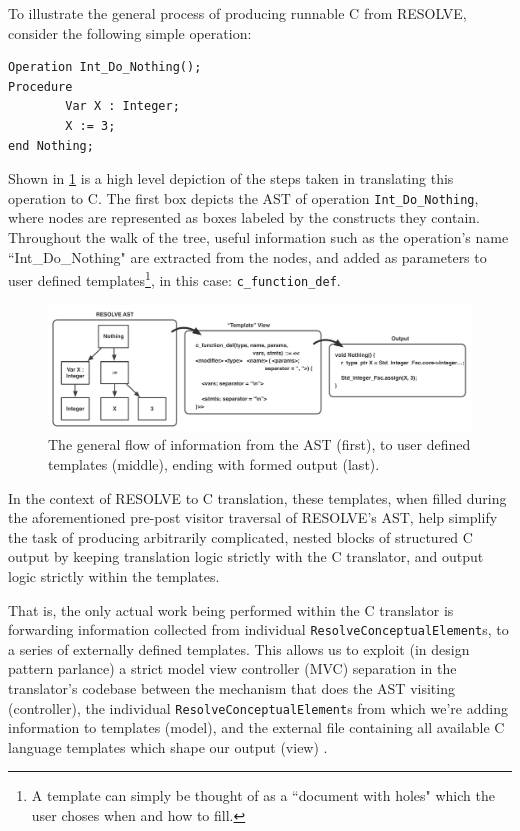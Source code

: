\documentclass[times]{speauth}
\begin{document}
To illustrate the general process of producing runnable C from RESOLVE, consider the following simple operation:

\begin{verbatim}
Operation Int_Do_Nothing();
Procedure
        Var X : Integer;
        X := 3;
end Nothing;
\end{verbatim}

Shown in \ref{fig:translationflow} is a high level depiction of the steps taken in translating this operation to C. The first box depicts the AST of operation \texttt{Int\_Do\_Nothing}, where nodes are represented as boxes labeled by the constructs they contain. Throughout the walk of the tree, useful information such as the operation's name ``Int\_Do\_Nothing" are extracted from the nodes, and added as parameters to user defined templates\footnote{A template can simply be thought of as a ``document with holes" which the user choses when and how to fill.}, in this case: \texttt{c\_function\_def}.

\begin{figure}
\centering
\includegraphics[scale=.40]{figures/ast_traversal2.pdf}
\caption{The general flow of information from the AST (first), to user defined templates (middle), ending with formed output (last).}
\label{fig:translationflow}
\end{figure}

In the context of RESOLVE to C translation, these templates, when filled during the aforementioned pre-post visitor traversal of RESOLVE's AST, help simplify the task of producing arbitrarily complicated, nested blocks of structured C output by keeping translation logic strictly with the C translator, and output logic strictly within the templates.

That is, the only actual work being performed within the C translator is forwarding information collected from individual \texttt{ResolveConceptualElement}s, to a series of externally defined templates. This allows us to exploit (in design pattern parlance) a strict model view controller (MVC) separation in the translator's codebase between the mechanism that does the AST visiting (controller), the individual \texttt{ResolveConceptualElement}s from which we're adding information to templates (model), and the external file containing all available C language templates which shape our output (view) \cite{krasner:1988}.
\end{document}
